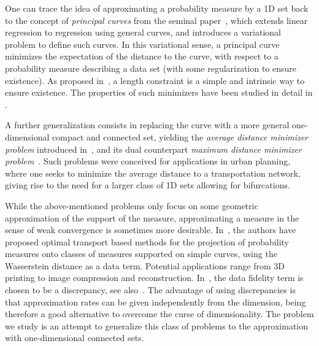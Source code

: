 \documentclass[JEP,XML,SOM,Unicode,NoFloatCountersInSection,published]{cedram}
\theoremstyle{definition}
\begin{document}
One can trace the idea of approximating a probability measure by a 1D set back to the concept of \textit{principal curves} from the seminal paper~\cite{hastie1989principal}, which extends linear regression to regression using general curves, and introduces a variational problem to define such curves.
In this variational sense, a principal curve minimizes the expectation of the distance to the curve, with respect to a probability measure describing a data set (with some regularization to ensure existence). As proposed in~\cite{kegl2000learning}, a length constraint is a simple and intrinsic way to ensure existence. The properties of such minimizers have been studied in detail in \eg \cite{lu2016average,delattre2020principal}.

A further generalization consists in replacing the curve with a more general one-dimensional compact and connected set, yielding the \textit{average distance minimizer problem} introduced in~\cite{buttazzo2003optimal}, and its dual counterpart \textit{maximum distance minimizer problem}~\cite{paolini2004qualitative,lemenant2010presentation}. Such problems were conceived for applications in urban planning, where one seeks to minimize the average distance to a transportation network, giving rise to the need for a larger class of 1D sets allowing for bifurcations.

While the above-mentioned problems only focus on some geometric approximation of the support of the measure, approximating a measure in the sense of weak convergence is sometimes more desirable. In~\cite{lebrat2019optimal,chauffert2017projection}, the authors have proposed optimal transport based methods for the projection of probability measures onto classes of measures supported on simple curves, using the Wasserstein distance as a data term. Potential applications range from 3D printing to image compression and reconstruction.
In~\cite{ehler2021curve}, the data fidelity term is chosen to be a discrepancy, see
also~\cite{neumayer2021optimal}. The advantage of using discrepancies is that approximation rates can be given independently from the dimension, being therefore a good alternative to overcome the curse of dimensionality. The problem we study is an attempt to generalize this class of problems
to the approximation with one-dimensional connected sets.
\end{document}
